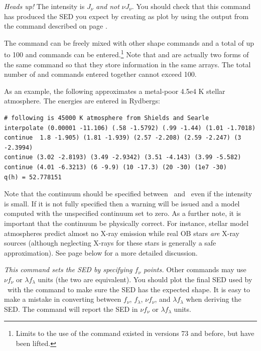 \emph{Heads up!}  The intensity is $J_\nu$ \emph{and not} $\nu J_\nu$.
You should check that this command has produced the SED you expect by creating
as plot by using the output from the  command
described on page \pageref{sec:CommandSaveIncidentContinuum}.

The  command can be freely mixed with other shape
commands and a total of up to 100  and  commands can be entered.\footnote{Limits to the
use of the
 command existed in versions 73
and before, but have been lifted.}  Note that  and
 are actually
two forms of the same command so that they store information in the same
arrays.
The total number of  and  commands entered together cannot exceed 100.

As an example, the following approximates a metal-poor 4.5e4 K stellar
atmosphere.  The energies are entered in Rydbergs:
\begin{verbatim}
# following is 45000 K atmosphere from Shields and Searle
interpolate (0.00001 -11.106) (.58 -1.5792) (.99 -1.44) (1.01 -1.7018)
continue  1.8 -1.905) (1.81 -1.939) (2.57 -2.208) (2.59 -2.247) (3 -2.3994)
continue (3.02 -2.8193) (3.49 -2.9342) (3.51 -4.143) (3.99 -5.582)
continue (4.01 -6.3213) (6 -9.9) (10 -17.3) (20 -30) (1e7 -30)
q(h) = 52.778151
\end{verbatim}
Note that the continuum should be specified between
\emm\ and
\egamry\ even if the intensity is small.
If it is not fully specified
then a warning will be issued and a model computed with the unspecified
continuum set to zero.
As a further note, it is important that the continuum
be physically correct.
For instance, stellar model atmospheres predict
almost no X-ray emission while real OB stars \emph{are} X-ray sources
(although neglecting X-rays for these stars is generally a safe
approximation).
See page \pageref{sec:StarHighEnergyComponent} below
for a more detailed discussion.

\emph{This command sets the SED by specifying $f_\nu$ points.}
Other commands may use $\nu f_\nu$ or $\lambda f_\lambda$ units (the two are equivalent).
You should plot the final SED used by \Cloudy\ with the
 command to make sure the SED has the expected shape.
It is easy to make a mistake in converting between $f_\nu$, $f_\lambda$,
$\nu f_\nu$, and $\lambda f_\lambda$ when deriving the SED.
The  command will report the SED in 
$\nu f_\nu$ or $\lambda f_\lambda$ units.

